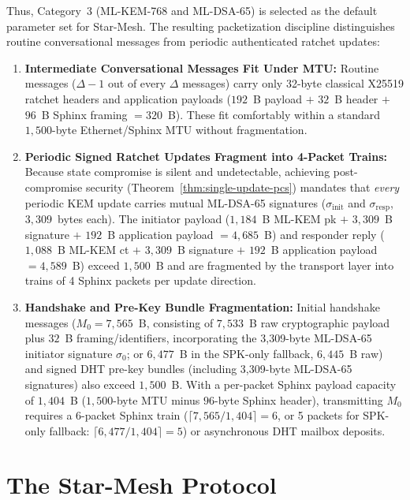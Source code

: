 \documentclass[11pt,a4paper]{article}
\theoremstyle{remark}
\theoremstyle{plain}
\begin{document}
Thus, Category~3 (ML-KEM-768 and ML-DSA-65) is selected as the default parameter set for Star-Mesh.  The resulting packetization discipline distinguishes routine conversational messages from periodic authenticated ratchet updates:
\begin{enumerate}
  \item \textbf{Intermediate Conversational Messages Fit Under MTU:} Routine messages ($\Delta - 1$ out of every $\Delta$ messages) carry only 32-byte classical X25519 ratchet headers and application payloads ($192$~B payload $+$ $32$~B header $+$ $96$~B Sphinx framing $= 320$~B).  These fit comfortably within a standard $1{,}500$-byte Ethernet/Sphinx MTU without fragmentation.
  \item \textbf{Periodic Signed Ratchet Updates Fragment into 4-Packet Trains:} Because state compromise is silent and undetectable, achieving post-compromise security (Theorem~\ref{thm:single-update-pcs}) mandates that \emph{every} periodic KEM update carries mutual ML-DSA-65 signatures ($\sigma_{\mathrm{init}}$ and $\sigma_{\mathrm{resp}}$, $3{,}309$~bytes each).  The initiator payload ($1{,}184$~B ML-KEM pk $+$ $3{,}309$~B signature $+$ $192$~B application payload $= 4{,}685$~B) and responder reply ($1{,}088$~B ML-KEM ct $+$ $3{,}309$~B signature $+$ $192$~B application payload $= 4{,}589$~B) exceed $1{,}500$~B and are fragmented by the transport layer into trains of 4 Sphinx packets per update direction.
  \item \textbf{Handshake and Pre-Key Bundle Fragmentation:} Initial handshake messages ($M_0 = 7{,}565$~B, consisting of $7{,}533$~B raw cryptographic payload plus $32$~B framing/identifiers, incorporating the 3{,}309-byte ML-DSA-65 initiator signature $\sigma_0$; or $6{,}477$~B in the SPK-only fallback, $6{,}445$~B raw) and signed DHT pre-key bundles (including 3{,}309-byte ML-DSA-65 signatures) also exceed $1{,}500$~B.  With a per-packet Sphinx payload capacity of $1{,}404$~B ($1{,}500$-byte MTU minus $96$-byte Sphinx header), transmitting $M_0$ requires a 6-packet Sphinx train ($\lceil 7{,}565 / 1{,}404 \rceil = 6$, or 5 packets for SPK-only fallback: $\lceil 6{,}477 / 1{,}404 \rceil = 5$) or asynchronous DHT mailbox deposits.
\end{enumerate}

\section{The Star-Mesh Protocol}
\label{sec:protocol}
\end{document}
